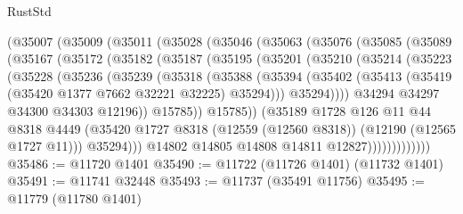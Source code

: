 \begin{lexlean}{RustStd}
\begin{coremodule}
      (@35007
        (@35009
          (@35011
            (@35028
              (@35046
                (@35063
                  (@35076
                    (@35085
                      (@35089
                        (@35167
                          (@35172
                            (@35182
                              (@35187
                                (@35195
                                  (@35201
                                    (@35210
                                      (@35214
                                        (@35223
                                          (@35228
                                            (@35236
                                              (@35239
                                                (@35318
                                                  (@35388
                                                    (@35394
                                                      (@35402
                                                        (@35413
                                                          (@35419
                                                            (@35420 @1377 @7662 @32221 @32225)
                                                            @35294)))
                                                      @35294))))
                                              @34294
                                              @34297
                                              @34300
                                              @34303
                                              @12196))
                                          @15785))
                                      @15785))
                                  (@35189
                                    @1728
                                    @126
                                    @11
                                    @44
                                    @8318
                                    @4449
                                    (@35420
                                      @1727
                                      @8318
                                      (@12559 (@12560 @8318))
                                      (@12190 (@12565 @1727 @11)))
                                    @35294)))
                              @14802
                              @14805
                              @14808
                              @14811
                              @12827)))))))))))))
@35486 := @11720 @1401
@35490 := @11722 (@11726 @1401) (@11732 @1401)
@35491 := @11741 @32448
@35493 := @11737 (@35491 @11756)
@35495 := @11779 (@11780 @1401)

\end{coremodule}
\end{lexlean}
